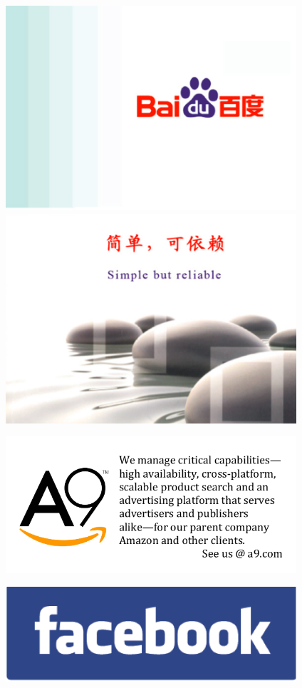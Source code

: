 \clearpage
\thispagestyle{empty}

\includegraphics[width=4.25in]{content/ads/platinum/Baidu-top.PNG}
\includegraphics[width=4.25in]{content/ads/platinum/Baidu-bottom.PNG}

\newpage
\thispagestyle{empty}

\includegraphics[width=4.25in]{content/ads/silver/A9-Ad.pdf}

\vfill

\includegraphics[width=4.25in]{content/ads/bronze/facebook.png}

